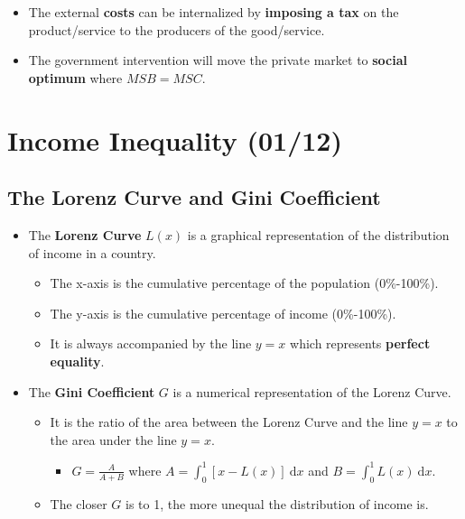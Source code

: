 \documentclass[
  letterpaper,
  DIV=11,
  numbers=noendperiod]{scrartcl}
\providecommand{\tightlist}{%
  \setlength{\itemsep}{0pt}\setlength{\parskip}{0pt}}\usepackage{longtable,booktabs,array}
\begin{document}
\begin{itemize}
\tightlist
\item
  The external \textbf{costs} can be internalized by \textbf{imposing a
  tax} on the product/service to the producers of the good/service.
\item
  The government intervention will move the private market to
  \textbf{social optimum} where \(MSB = MSC\).
\end{itemize}

\newpage{}

\hypertarget{income-inequality-0112}{%
\section{Income Inequality (01/12)}\label{income-inequality-0112}}

\hypertarget{the-lorenz-curve-and-gini-coefficient}{%
\subsection{The Lorenz Curve and Gini
Coefficient}\label{the-lorenz-curve-and-gini-coefficient}}

\begin{itemize}
\tightlist
\item
  The \textbf{Lorenz Curve} \(L(x)\) is a graphical representation of
  the distribution of income in a country.

  \begin{itemize}
  \tightlist
  \item
    The x-axis is the cumulative percentage of the population
    (0\%-100\%).
  \item
    The y-axis is the cumulative percentage of income (0\%-100\%).
  \item
    It is always accompanied by the line \(y=x\) which represents
    \textbf{perfect equality}.
  \end{itemize}
\item
  The \textbf{Gini Coefficient} \(G\) is a numerical representation of
  the Lorenz Curve.

  \begin{itemize}
  \tightlist
  \item
    It is the ratio of the area between the Lorenz Curve and the line
    \(y=x\) to the area under the line \(y=x\).

    \begin{itemize}
    \tightlist
    \item
      \(G = \frac{A}{A+B}\) where
      \(A = \int_{0}^{1} \left[x-L(x)\right] \ \mathrm{d}x\) and
      \(B = \int_{0}^{1}L(x) \ \mathrm{d}x\).
    \end{itemize}
  \item
    The closer \(G\) is to 1, the more unequal the distribution of
    income is.
  \end{itemize}
\end{itemize}
\end{document}
